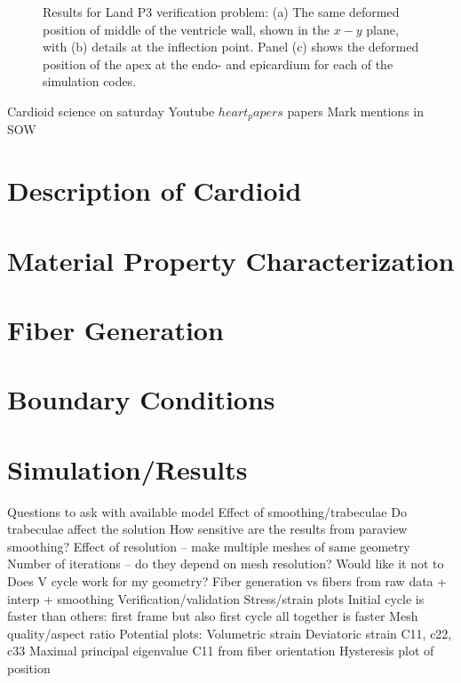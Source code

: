 \begin{figure}[ht!]
%
\caption{Results for Land P3 verification problem: (a) The same deformed position of middle of the ventricle wall, shown in the $x-y$ plane, with (b) details at the inflection point. Panel (c) shows the deformed position of the apex at the endo- and epicardium for each of the simulation codes.}
\label{fig:land3.2}
\end{figure}



Cardioid science on saturday Youtube
$heart_papers$
papers Mark mentions in SOW

\section{Description of Cardioid}
\label{Description of Cardioid}

\section{Material Property Characterization}
\label{Material Property Characterization}

\section{Fiber Generation}
\label{Simulation}

\section{Boundary Conditions}
\label{Boundary Conditions}

\section{Simulation/Results}
\label{Simulation/Results}


Questions to ask with available model
Effect of smoothing/trabeculae
Do trabeculae affect the solution
How sensitive are the results from paraview smoothing?
Effect of resolution – make multiple meshes of same geometry
Number of iterations – do they depend on mesh resolution? Would like it not to 
Does V cycle work for my geometry?
Fiber generation vs fibers from raw data + interp + smoothing
Verification/validation
Stress/strain plots
Initial cycle is faster than others: first frame but also first cycle all together is faster
Mesh quality/aspect ratio
Potential plots:	
Volumetric strain
Deviatoric strain
C11, c22, c33
Maximal principal eigenvalue
C11 from fiber orientation
Hysteresis plot of position

